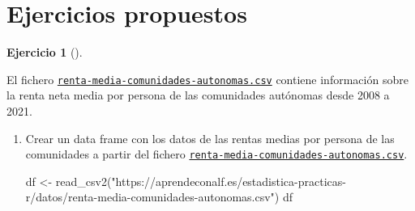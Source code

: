 \documentclass[
  a4paper,
]{scrreport}
\newenvironment{Shaded}{\begin{snugshade}}{\end{snugshade}}
\newcommand{\FunctionTok}[1]{\textcolor[rgb]{0.28,0.35,0.67}{#1}}
\newcommand{\NormalTok}[1]{\textcolor[rgb]{0.00,0.23,0.31}{#1}}
\newcommand{\OtherTok}[1]{\textcolor[rgb]{0.00,0.23,0.31}{#1}}
\newcommand{\StringTok}[1]{\textcolor[rgb]{0.13,0.47,0.30}{#1}}
\theoremstyle{definition}
\newtheorem{exercise}{Ejercicio}[chapter]
\theoremstyle{remark}
\begin{document}
\hypertarget{ejercicios-propuestos-2}{%
\section{Ejercicios propuestos}\label{ejercicios-propuestos-2}}

\begin{exercise}[]\protect\hypertarget{exr-descriptiva-3}{}\label{exr-descriptiva-3}

El fichero
\href{datos/renta-media-comunidades-autonomas.csv}{\texttt{renta-media-comunidades-autonomas.csv}}
contiene información sobre la renta neta media por persona de las
comunidades autónomas desde 2008 a 2021.

\begin{enumerate}
\def\labelenumi{\alph{enumi}.}
\item
  Crear un data frame con los datos de las rentas medias por persona de
  las comunidades a partir del fichero
  \href{datos/renta-media-comunidades-autonomas.csv}{\texttt{renta-media-comunidades-autonomas.csv}}.

  \begin{tcolorbox}[enhanced jigsaw, coltitle=black, left=2mm, colback=white, leftrule=.75mm, toptitle=1mm, breakable, bottomrule=.15mm, titlerule=0mm, bottomtitle=1mm, title=\textcolor{quarto-callout-tip-color}{\faLightbulb}\hspace{0.5em}{Solución}, arc=.35mm, toprule=.15mm, rightrule=.15mm, colframe=quarto-callout-tip-color-frame, opacityback=0, colbacktitle=quarto-callout-tip-color!10!white, opacitybacktitle=0.6]

\begin{Shaded}
\begin{Highlighting}[]
\NormalTok{df }\OtherTok{\textless{}{-}} \FunctionTok{read\_csv2}\NormalTok{(}\StringTok{"https://aprendeconalf.es/estadistica{-}practicas{-}r/datos/renta{-}media{-}comunidades{-}autonomas.csv"}\NormalTok{)}
\NormalTok{df}
\end{Highlighting}
\end{Shaded}


\end{tcolorbox}
\end{enumerate}
\end{exercise}
\end{document}
